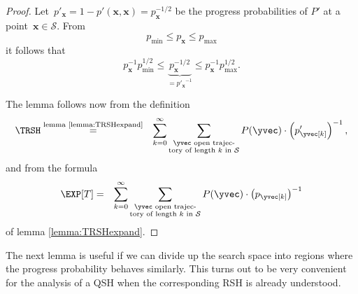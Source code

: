 \begin{proof}

  Let~$p'_{\mathbf{x}}=1-p'(\mathbf{x},\mathbf{x}) =
  p_{\mathbf{x}}^{-1/2}$ be the progress probabilities of $P'$ at a
  point~$\mathbf{x}\in\mathcal{S}$.  From
  \[
  p_{\min}\le p_{\mathbf{x}}\le p_{\max}
  \]
  it follows that
  \[
  p_{\mathbf{x}}^{-1} p_{\min}^{1/2}\leq
  \underbrace{{p_{\mathbf{x}}^{-1/2}}}_{= {p'_{\mathbf{x}}}^{-1}} \leq
  p_{\mathbf{x}}^{-1} p_{\max}^{1/2}.
  \]

  The lemma follows now from the definition
  \begin{eqnarray*}
    \TRSH & \stackrel{\text{lemma \ref{lemma:TRSHexpand}}}{=} & \sum_{k=0}^{\infty} \sum_{\substack{\yvec\text{ open trajec-} \\ \text{tory of length $k$ in $\mathcal{S}$}}} P(\yvec)\cdot \left(p'_{\yvec[k]}\right)^{-1},
  \end{eqnarray*}
  and from the formula
  \begin{eqnarray*}
    \EXP[T] & = & \sum_{k=0}^{\infty} \sum_{\substack{\yvec\text{ open trajec-} \\ \text{tory of length $k$ in $\mathcal{S}$}}} P(\yvec)\cdot \left(p_{\yvec[k]}\right)^{-1}
  \end{eqnarray*}
  of lemma \ref{lemma:TRSHexpand}.

\end{proof}

The next lemma is useful if we can divide up the search space into
regions where the progress probability behaves similarly. This turns
out to be very convenient for the analysis of a QSH when the
corresponding RSH is already understood.

